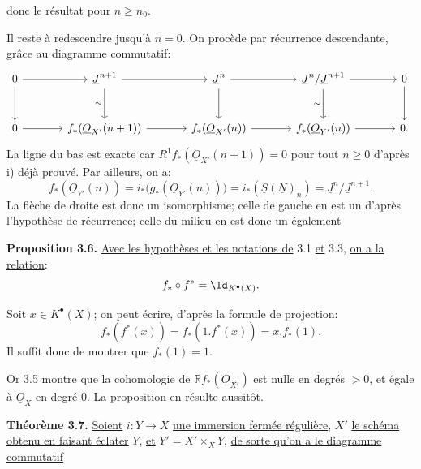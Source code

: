 
donc le résultat pour \(n\ge n_0\).

Il reste à redescendre jusqu'à \(n=0\). On procède par récurrence descendante, grâce au diagramme commutatif:
\[
\begin{tikzcd}[column sep=large,row sep=large]
0 \arrow[r] \arrow[d] &
\underline{J}^{n+1} \arrow[r] \arrow[d,"\sim"'] &
\underline{J}^n \arrow[r] \arrow[d] &
\underline{J}^n/\underline{J}^{n+1} \arrow[r] \arrow[d,"\sim"'] &
0 \arrow[d]\\
0 \arrow[r] &
f_*(\underline{O}_{X'}(n+1)) \arrow[r] &
f_*(\underline{O}_{X'}(n)) \arrow[r] &
f_*(\underline{O}_{Y'}(n)) \arrow[r] &
0.
\end{tikzcd}
\]
La ligne du bas est exacte car \(R^1f_*(\underline{O}_{X'}(n+1))=0\) pour tout \(n\ge0\) d'après i) déjà prouvé. Par ailleurs, on a:
\[
f_*(\underline{O}_{Y'}(n))
=i_*\bigl(g_*(\underline{O}_{Y'}(n))\bigr)
=i_*(\underline{\underline{S}}(\underline{N})_n)
=\underline{J}^n/\underline{J}^{n+1}.
\]
La flèche de droite est donc un isomorphisme; celle de gauche en est un d'après l'hypothèse de récurrence; celle du milieu en est donc un également

\textbf{Proposition 3.6.} \uline{Avec les hypothèses et les notations de} 3.1 \uline{et} 3.3, \uline{on a la relation}:
\[
f_*\circ f^*=\Id_{K^{\bullet}(X)}.
\]

Soit \(x\in K^{\bullet}(X)\); on peut écrire, d'après la formule de projection:
\[
f_*(f^*(x))=f_*(1.f^*(x))=x.f_*(1).
\]
Il suffit donc de montrer que \(f_*(1)=1\).

Or 3.5 montre que la cohomologie de \(\mathbb Rf_*(\underline{O}_{X'})\) est nulle en degrés \(>0\), et égale à \(\underline{O}_X\) en degré \(0\). La proposition en résulte aussitôt.

\textbf{Théorème 3.7.} \uline{Soient} \(i:Y\to X\) \uline{une immersion fermée régulière}, \(X'\) \uline{le schéma obtenu en faisant éclater} \(Y\), \uline{et} \(Y'=X'\times_XY\), \uline{de sorte qu'on a le diagramme commutatif}
